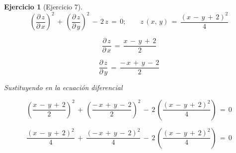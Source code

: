 \documentclass[a4paper,11pt]{book}
\newtheorem{ejer}{Ejercicio}[section]
\begin{document}
\begin{ejer}[Ejercicio 7] 

$$\left(\dfrac{\partial\,z}{\partial\,x} \right)^{2}\,+\,\left(\dfrac{\partial\,z}{\partial\,y} \right)^{2}\,-\,2\,z\,=\,0; \qquad z\,(x,\,y)\,=\,\dfrac{(x\,-\,y\,+\,2)^{2}}{4}$$


$$\dfrac{\partial\,z}{\partial\,x}\,=\,\boxed{\dfrac{x\,-\,y\,+\,2}{2}}$$

$$\dfrac{\partial\,z}{\partial\,y}\,=\,\boxed{\dfrac{-\,x\,+\,y\,-\,2}{2}}$$

Sustituyendo en la ecuación diferencial

$$\left(\dfrac{x\,-\,y\,+\,2}{2}\right)^{2}\,+\,\left(\dfrac{-\,x\,+\,y\,-\,2}{2}\right)^{2}\,-\,2\,\left(\dfrac{(x\,-\,y\,+\,2)^{2}}{4}\right)\,=\,0$$

$$\dfrac{(x\,-\,y\,+\,2)^{2}}{4}\,+\,\dfrac{(-\,x\,+\,y\,-\,2)^{2}}{4}\,-\,2\,\left(\dfrac{(x\,-\,y\,+\,2)^{2}}{4}\right)\,=\,0$$

\end{ejer} 
\end{document}

